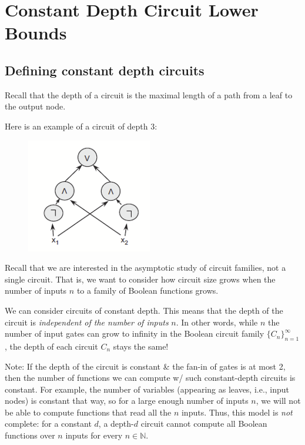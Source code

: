 %
%  
%
%










\chapter{Constant Depth Circuit Lower Bounds}
\label{hastad} %

\section{Defining constant depth circuits}
Recall that the depth of a circuit is the maximal length of a path from a leaf to the output node.

Here is an example of a circuit of depth 3:
\begin{figure}
    \centering
    \includegraphics[width=0.25\linewidth]{images/depth 3 circuit.png}
    \label{fig:enter-label}
\end{figure}

Recall that we are interested in the asymptotic study of circuit families, not a single circuit. That is, we want to consider how circuit size grows when the number of inputs $n$ to a family of Boolean functions grows.

We can consider circuits of constant depth. This means that the depth of the circuit is \emph{independent of the number of inputs} $n$. In other words,  while $n$ the number of input gates can grow to infinity in the Boolean circuit family $\{C_n\}_{n=1}^\infty$, the depth of each circuit $C_n$ stays the same!


Note: If the depth of the circuit is constant \& the fan-in of gates is at most 2, then the number of functions we can compute w/ such constant-depth circuits is constant. For example, the number of variables (appearing as leaves, i.e., input nodes) is constant that way, so for a large enough number of inputs $n$, we will not be able to compute functions that read all the $n$ inputs.  
Thus, this model is \emph{not} complete: for a constant $d$, a depth-$d$ circuit cannot compute all Boolean functions over $n$ inputs for every $n \in \mathbb{N}$.

